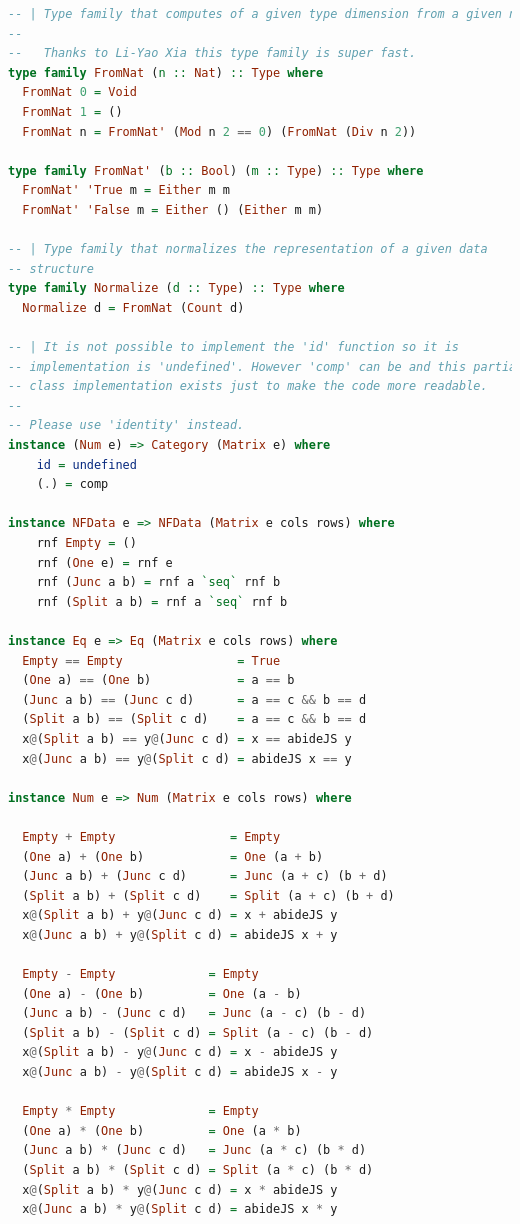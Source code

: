 \documentclass[
  oneside,
  11pt, a4paper,
  footinclude=true,
  headinclude=true,
  cleardoublepage=empty
]{scrbook}
\theoremstyle{definition}
\theoremstyle{definition}
\begin{document}
\begin{lstlisting}[language=Haskell, caption={Type safe inductive matrix library},captionpos=b]
-- | Type family that computes of a given type dimension from a given natural
--
--   Thanks to Li-Yao Xia this type family is super fast.
type family FromNat (n :: Nat) :: Type where
  FromNat 0 = Void
  FromNat 1 = ()
  FromNat n = FromNat' (Mod n 2 == 0) (FromNat (Div n 2))

type family FromNat' (b :: Bool) (m :: Type) :: Type where
  FromNat' 'True m = Either m m
  FromNat' 'False m = Either () (Either m m)

-- | Type family that normalizes the representation of a given data
-- structure
type family Normalize (d :: Type) :: Type where
  Normalize d = FromNat (Count d)

-- | It is not possible to implement the 'id' function so it is
-- implementation is 'undefined'. However 'comp' can be and this partial
-- class implementation exists just to make the code more readable.
--
-- Please use 'identity' instead.
instance (Num e) => Category (Matrix e) where
    id = undefined
    (.) = comp

instance NFData e => NFData (Matrix e cols rows) where
    rnf Empty = ()
    rnf (One e) = rnf e
    rnf (Junc a b) = rnf a `seq` rnf b
    rnf (Split a b) = rnf a `seq` rnf b

instance Eq e => Eq (Matrix e cols rows) where
  Empty == Empty                = True
  (One a) == (One b)            = a == b
  (Junc a b) == (Junc c d)      = a == c && b == d
  (Split a b) == (Split c d)    = a == c && b == d
  x@(Split a b) == y@(Junc c d) = x == abideJS y
  x@(Junc a b) == y@(Split c d) = abideJS x == y

instance Num e => Num (Matrix e cols rows) where

  Empty + Empty                = Empty
  (One a) + (One b)            = One (a + b)
  (Junc a b) + (Junc c d)      = Junc (a + c) (b + d)
  (Split a b) + (Split c d)    = Split (a + c) (b + d)
  x@(Split a b) + y@(Junc c d) = x + abideJS y
  x@(Junc a b) + y@(Split c d) = abideJS x + y

  Empty - Empty             = Empty
  (One a) - (One b)         = One (a - b)
  (Junc a b) - (Junc c d)   = Junc (a - c) (b - d)
  (Split a b) - (Split c d) = Split (a - c) (b - d)
  x@(Split a b) - y@(Junc c d) = x - abideJS y
  x@(Junc a b) - y@(Split c d) = abideJS x - y

  Empty * Empty             = Empty
  (One a) * (One b)         = One (a * b)
  (Junc a b) * (Junc c d)   = Junc (a * c) (b * d)
  (Split a b) * (Split c d) = Split (a * c) (b * d)
  x@(Split a b) * y@(Junc c d) = x * abideJS y
  x@(Junc a b) * y@(Split c d) = abideJS x * y


\end{lstlisting}
\end{document}
